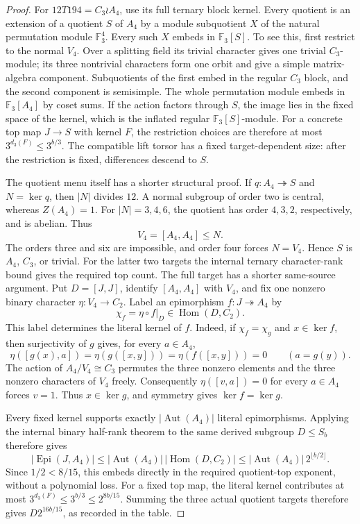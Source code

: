 \begin{proof}
For $12T194=C_3\wr A_4$, use its full ternary block kernel.
Every quotient is an extension of a quotient $S$ of $A_4$ by a
module subquotient $X$ of the natural permutation module
$\mathbb F_3^4$. Every such $X$ embeds in $\mathbb F_3[S]$.
To see this, first restrict to the normal $V_4$. Over a splitting
field its trivial character gives one trivial $C_3$-module;
its three nontrivial characters form one orbit and give a simple
matrix-algebra component. Subquotients of the first embed in the
regular $C_3$ block, and the second component is semisimple.
The whole permutation module embeds in $\mathbb F_3[A_4]$ by
coset sums. If the action factors through $S$, the image lies in
the fixed space of the kernel, which is the inflated regular
$\mathbb F_3[S]$-module. For a concrete top map $J\to S$ with
kernel $F$, the restriction choices are therefore at most
$3^{d_3(F)}\leq3^{b/3}$. The compatible lift torsor has a fixed
target-dependent size: after the restriction is fixed, differences
descend to $S$.

The quotient menu itself has a shorter structural proof.  If
$q:A_4\twoheadrightarrow S$ and $N=\ker q$, then $|N|$ divides $12$.
A normal subgroup of order two is central, whereas $Z(A_4)=1$.
For $|N|=3,4,6$, the quotient has order $4,3,2$, respectively, and is
abelian.  Thus
\[
 V_4=[A_4,A_4]\leq N.
\]
The orders three and six are impossible, and order four forces $N=V_4$.
Hence $S$ is $A_4$, $C_3$, or trivial.  For the latter two targets the
internal ternary character-rank bound gives the required top count.  The
full target has a shorter same-source argument.  Put $D=[J,J]$, identify
$[A_4,A_4]$ with $V_4$, and fix one nonzero binary character
$\eta:V_4\to C_2$.  Label an epimorphism $f:J\twoheadrightarrow A_4$ by
\[
 \chi_f=\eta\circ f|_D\in\operatorname{Hom}(D,C_2).
\]
This label determines the literal kernel of $f$.  Indeed, if
$\chi_f=\chi_g$ and $x\in\ker f$, then surjectivity of $g$ gives, for
every $a\in A_4$,
\[
 \eta([g(x),a])=\eta(g([x,y]))=\eta(f([x,y]))=0
 \qquad(a=g(y)).
\]
The action of $A_4/V_4\cong C_3$ permutes the three nonzero elements and
the three nonzero characters of $V_4$ freely.  Consequently
$\eta([v,a])=0$ for every $a\in A_4$ forces $v=1$.  Thus
$x\in\ker g$, and symmetry gives $\ker f=\ker g$.

Every fixed kernel supports exactly $|\operatorname{Aut}(A_4)|$ literal
epimorphisms.  Applying the internal binary half-rank theorem to the same
derived subgroup $D\leq S_b$ therefore gives
\[
 |\operatorname{Epi}(J,A_4)|
 \leq |\operatorname{Aut}(A_4)|\,|\operatorname{Hom}(D,C_2)|
 \leq |\operatorname{Aut}(A_4)|\,2^{\lfloor b/2\rfloor}.
\]
Since $1/2<8/15$, this embeds directly in the required quotient-top
exponent, without a polynomial loss.
For a fixed top map, the literal kernel contributes at most
$3^{d_3(F)}\leq3^{b/3}\leq2^{8b/15}$.  Summing the three actual quotient
targets therefore gives $D2^{16b/15}$, as recorded in the table.


\end{proof}
